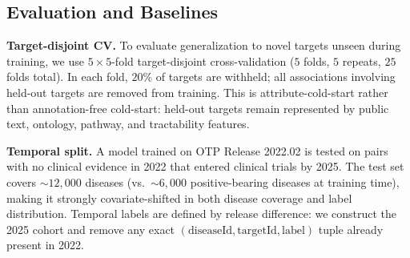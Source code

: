 \documentclass{article}
\begin{document}
\subsection{Evaluation and Baselines}
\label{sec:eval}

\textbf{Target-disjoint CV.}
To evaluate generalization to novel targets unseen during training, we
use $5{\times}5$-fold target-disjoint cross-validation ($5$ folds,
$5$ repeats, $25$ folds total).
In each fold, $20\%$ of targets are withheld; all associations involving
held-out targets are removed from training.
This is attribute-cold-start rather than annotation-free cold-start:
held-out targets remain represented by public text, ontology, pathway,
and tractability features.

\textbf{Temporal split.}
A model trained on OTP Release 2022.02 is tested on pairs with no
clinical evidence in 2022 that entered clinical trials by 2025.
The test set covers ${\sim}12{,}000$ diseases (vs.\ ${\sim}6{,}000$
positive-bearing diseases at training time), making it strongly
covariate-shifted in both disease coverage and label distribution.
Temporal labels are defined by release difference: we construct the 2025 cohort and remove any exact
$(\mathrm{diseaseId},\mathrm{targetId},\mathrm{label})$ tuple already present
in 2022.
\end{document}
